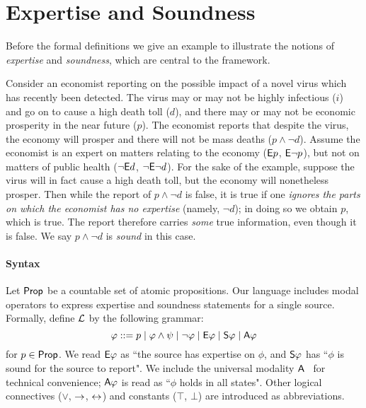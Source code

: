 \section{Expertise and Soundness}
\label{sec_expertise_and_soundness}

Before the formal definitions we give an example to illustrate the notions of
\emph{expertise} and \emph{soundness}, which are central to the framework.

\begin{example}
    \label{ex_economist_motivation}

    Consider an economist reporting on the possible impact of a novel virus
    which has recently been detected. The virus may or may not be highly
    infectious ($i$) and go on to cause a high death toll ($d$), and there may
    or may not be economic prosperity in the near future ($p$). The economist
    reports that despite the virus, the economy will prosper and there will not
    be mass deaths ($p \land \neg d$). Assume the economist is an expert on
    matters relating to the economy ($\E p$, $\E\neg p$), but not on matters of
    public health ($\neg\E d$, $\neg\E\neg d$). For the sake of the example,
    suppose the virus will in fact cause a high death toll, but the economy
    will nonetheless prosper. Then while the report of $p \land \neg d$ is
    false, it is true if one \emph{ignores the parts on which the economist has
    no expertise} (namely, $\neg d$); in doing so we obtain $p$, which is true.
    The report therefore carries \emph{some} true information, even though it
    is false. We say $p \land \neg d$ is \emph{sound} in this case.

\end{example}

\paragraph{Syntax}

Let $\Prop$ be a countable set of atomic propositions. Our language
includes modal operators to express expertise and soundness statements for a
single source. Formally, define $\cL$ by the following grammar:
\[
\phi ::=
 p \mid
 \phi \land \psi \mid
 \neg\phi \mid
 \E\phi \mid
 \S\phi \mid
 \A\phi
\]
for $p \in \Prop$. We read $\E\phi$ as ``the source has expertise on
$\phi$, and $\S\phi$ has ``$\phi$ is sound for the source to
report". We include the universal modality $\A$~\citep{goranko_1992}
for technical convenience; $\A\phi$ is read as ``$\phi$ holds in all
states".  Other logical connectives ($\lor$, $\limplies$,
$\liff$) and constants ($\top$, $\bot$) are introduced as
abbreviations.

